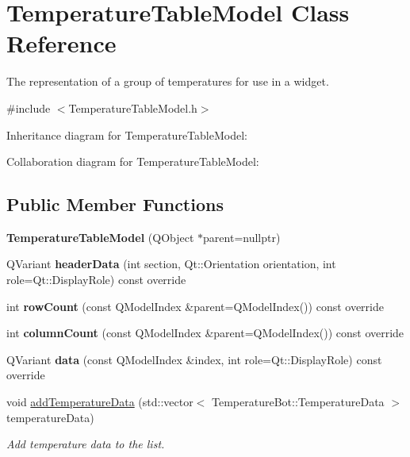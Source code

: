 \hypertarget{classTemperatureTableModel}{}\section{Temperature\+Table\+Model Class Reference}
\label{classTemperatureTableModel}


The representation of a group of temperatures for use in a widget.  




{\ttfamily \#include $<$Temperature\+Table\+Model.\+h$>$}



Inheritance diagram for Temperature\+Table\+Model\+:


Collaboration diagram for Temperature\+Table\+Model\+:
\subsection*{Public Member Functions}
\begin{DoxyCompactItemize}
\item 
\mbox{\label{classTemperatureTableModel_acc3ccea22bfd19c4e93863175ae43bfd}} 
{\bfseries Temperature\+Table\+Model} (Q\+Object $\ast$parent=nullptr)
\item 
\mbox{\label{classTemperatureTableModel_ab50e35137a162d9a65bba048a8258a62}} 
Q\+Variant {\bfseries header\+Data} (int section, Qt\+::\+Orientation orientation, int role=Qt\+::\+Display\+Role) const override
\item 
\mbox{\label{classTemperatureTableModel_a87a759e29a7386004078d551907cdf99}} 
int {\bfseries row\+Count} (const Q\+Model\+Index \&parent=Q\+Model\+Index()) const override
\item 
\mbox{\label{classTemperatureTableModel_aafd09fffe950c9c758862f6c3203def6}} 
int {\bfseries column\+Count} (const Q\+Model\+Index \&parent=Q\+Model\+Index()) const override
\item 
\mbox{\label{classTemperatureTableModel_ac44983cd88fff72038e482495d02b445}} 
Q\+Variant {\bfseries data} (const Q\+Model\+Index \&index, int role=Qt\+::\+Display\+Role) const override
\item 
\mbox{\label{classTemperatureTableModel_a952279da7d3bb99ad61c255fb31347bf}} 
void \hyperlink{classTemperatureTableModel_a952279da7d3bb99ad61c255fb31347bf}{add\+Temperature\+Data} (std\+::vector$<$ Temperature\+Bot\+::\+Temperature\+Data $>$ temperature\+Data)
\begin{DoxyCompactList}\small\item\em Add temperature data to the list. \end{DoxyCompactList}\end{DoxyCompactItemize}


